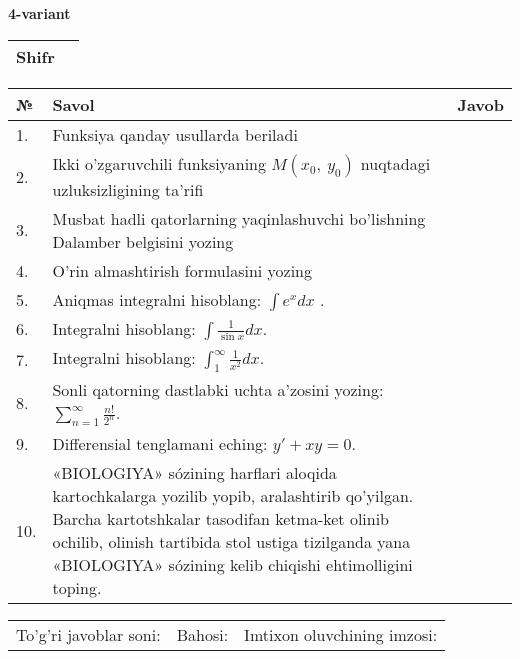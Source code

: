\documentclass{article}
\begin{document}
  \egroup
  
  \newpage
  
  
  \textbf{4-variant}\\
  
  \bgroup
  \def\arraystretch{1.6} %
  
  \begin{tabular}{|m{5.7cm}|m{9.5cm}|}
  \hline
  Shifr & \\
  \hline
  \end{tabular}
  
  \vspace{1cm}
  
  \begin{tabular}{|m{0.7cm}|m{10cm}|m{4cm}|}
  \hline
  № & Savol & Javob \\
  \hline
  1. & Funksiya qanday usullarda beriladi &  \\
  \hline
  2. & Ikki o'zgaruvchili funksiyaning \(M(x_{0},\ y_{0})\) nuqtadagi uzluksizligining ta'rifi &  \\
  \hline
  3. & Musbat hadli qatorlarning yaqinlashuvchi bo'lishning Dalamber belgisini yozing &  \\
  \hline
  4. & O'rin almashtirish formulasini yozing &  \\
  \hline
  5. & Aniqmas integralni hisoblang: \(\int {e^{x}dx}\) . &  \\
  \hline
  6. & Integralni hisoblang: \(\int {\frac{1}{\sin x}dx}\). &  \\
  \hline
  7. & Integralni hisoblang: \(\int_{1}^{\infty}{\frac{1}{x^{2}}dx}\). &  \\
  \hline
  8. & Sonli qatorning dastlabki uchta a'zosini yozing: \(\sum_{n = 1}^{\infty}\frac{n!}{2^{n}}\). &  \\
  \hline
  9. & Differensial tenglamani eching: \(y' + xy = 0\). &  \\
  \hline
  10. & «BIOLOGIYA» sózining harflari aloqida kartochkalarga yozilib yopib, aralashtirib qo'yilgan. Barcha kartotshkalar tasodifan ketma-ket olinib ochilib, olinish tartibida stol ustiga tizilganda yana «BIOLOGIYA» sózining kelib chiqishi ehtimolligini toping. &  \\
  \hline
  \end{tabular}
  
  \vspace{1cm}
  
  \begin{tabular}{lll}
  To'g'ri javoblar soni: \underline{\hspace{1.5cm}} & 
  Bahosi: \underline{\hspace{1.5cm}} & 
  Imtixon oluvchining imzosi: \underline{\hspace{2cm}} \\
  \end{tabular}
  
\end{document}
